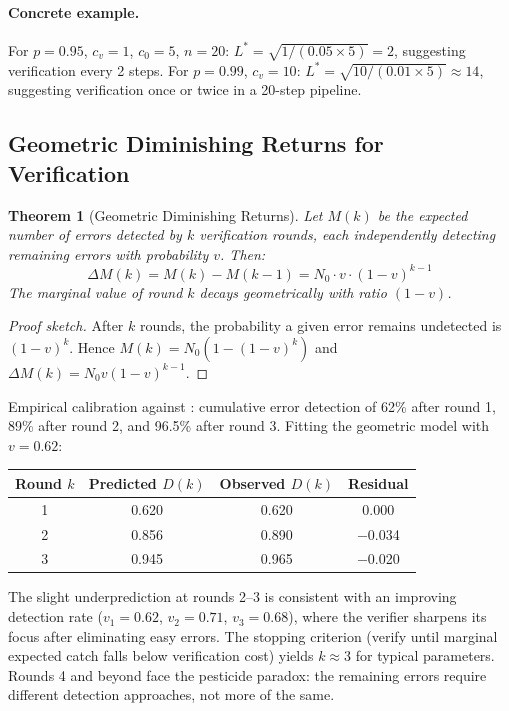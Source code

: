 \documentclass[11pt, a4paper]{googledeepmind}
\newtheorem{theorem}{Theorem}[section]
\begin{document}
\paragraph{Concrete example.} For $p = 0.95$, $c_v = 1$, $c_0 = 5$, $n = 20$: $L^* = \sqrt{1/(0.05 \times 5)} = 2$, suggesting verification every 2 steps. For $p = 0.99$, $c_v = 10$: $L^* = \sqrt{10/(0.01 \times 5)} \approx 14$, suggesting verification once or twice in a 20-step pipeline.

\subsection{Geometric Diminishing Returns for Verification}

\begin{theorem}[Geometric Diminishing Returns]
\label{thm:diminishing-returns}
Let $M(k)$ be the expected number of errors detected by $k$ verification rounds, each independently detecting remaining errors with probability $v$. Then:
\begin{equation}
    \Delta M(k) = M(k) - M(k-1) = N_0 \cdot v \cdot (1-v)^{k-1}
\end{equation}
The marginal value of round $k$ decays geometrically with ratio $(1-v)$.
\end{theorem}

\begin{proof}[Proof sketch]
After $k$ rounds, the probability a given error remains undetected is $(1-v)^k$. Hence $M(k) = N_0(1 - (1-v)^k)$ and $\Delta M(k) = N_0 v (1-v)^{k-1}$.
\end{proof}

Empirical calibration against \citet{hariharan2025plan}: cumulative error detection of 62\% after round 1, 89\% after round 2, and 96.5\% after round 3. Fitting the geometric model with $v = 0.62$:

\begin{center}
\small
\begin{tabular}{cccc}
\toprule
Round $k$ & Predicted $D(k)$ & Observed $D(k)$ & Residual \\
\midrule
1 & 0.620 & 0.620 & 0.000 \\
2 & 0.856 & 0.890 & $-$0.034 \\
3 & 0.945 & 0.965 & $-$0.020 \\
\bottomrule
\end{tabular}
\end{center}

The slight underprediction at rounds 2--3 is consistent with an improving detection rate ($v_1 = 0.62$, $v_2 = 0.71$, $v_3 = 0.68$), where the verifier sharpens its focus after eliminating easy errors. The stopping criterion (verify until marginal expected catch falls below verification cost) yields $k \approx 3$ for typical parameters. Rounds 4 and beyond face the pesticide paradox: the remaining errors require different detection approaches, not more of the same.
\end{document}
